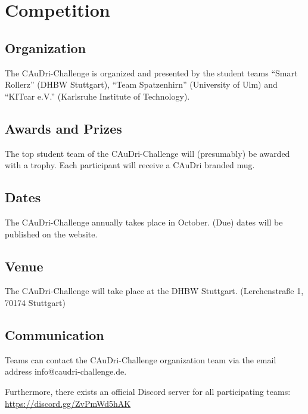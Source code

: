 \chapter{Competition}

\section{Organization}

The CAuDri-Challenge is organized and presented by the student teams “Smart
Rollerz” (DHBW Stuttgart), “Team Spatzenhirn” (University of Ulm) and “KITcar
e.V.” (Karlsruhe Institute of Technology).

\section{Awards and Prizes}

The top student team of the CAuDri-Challenge will (presumably) be awarded with
a trophy. Each participant will receive a CAuDri branded mug.

\section{Dates}

The CAuDri-Challenge annually takes place in October. (Due) dates will be
published on the website.

\section{Venue}

The CAuDri-Challenge will take place at the DHBW Stuttgart. (Lerchenstraße 1,
70174 Stuttgart)

\section{Communication}

Teams can contact the CAuDri-Challenge organization team via the email address
info@caudri-challenge.de.

Furthermore, there exists an official Discord server for all participating
teams:\\ \href{https://discord.gg/ZvPmWd5hAK}{https://discord.gg/ZvPmWd5hAK}